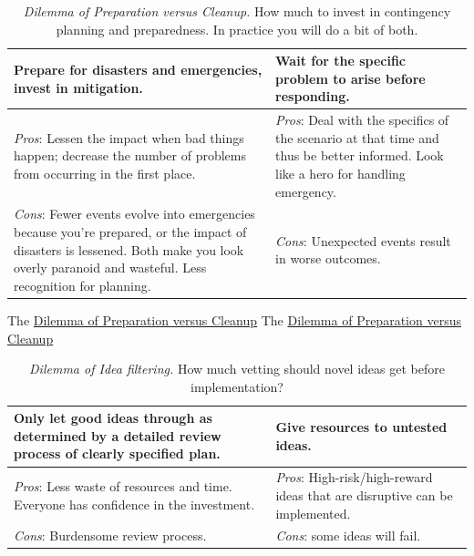 \begin{center}
\begin{table}[H] %
\begin{tabular}{ | m{\dilemmatablewidth}| m{\dilemmatablewidth} | } 
  \hline
  \textbf{Prepare for disasters and emergencies, invest in mitigation.} &
  \textbf{Wait for the specific problem to arise before responding.} \\
  \hline
  \textit{Pros}: Lessen the impact when bad things happen; decrease the number of problems from occurring in the first place. &
  \textit{Pros}: Deal with the specifics of the scenario at that time and thus be better informed. Look like a hero for handling emergency. \\
  \hline
  \textit{Cons}: Fewer events evolve into emergencies because you're prepared, or the impact of disasters is lessened. Both make you look overly paranoid and wasteful. Less recognition for planning. & 
  \textit{Cons}: Unexpected events result in worse outcomes.  \\
  \hline
\end{tabular}
\caption{
\textit{Dilemma of Preparation versus Cleanup.} 
How much to invest in contingency planning and preparedness. In practice you will do a bit of both.}
\label{table:emergencies-vs-ignore}
\end{table}
\end{center}

The \href{table:emergencies-vs-ignore}{Dilemma of Preparation versus Cleanup}
The \href{table:emergencies-vs-ignore}{Dilemma of Preparation versus Cleanup}


\begin{center}
\begin{table}[H] %
\begin{tabular}{ | m{\dilemmatablewidth}| m{\dilemmatablewidth} | } 
  \hline
  \textbf{Only let good ideas through as determined by a detailed review process of clearly specified plan.} &
  \textbf{Give resources to untested ideas.} \\
  \hline
  \textit{Pros}: Less waste of resources and time. Everyone has confidence in the investment. & 
  \textit{Pros}: High-risk/high-reward ideas that are disruptive can be implemented. \\
  \hline
  \textit{Cons}: Burdensome review process. & 
  \textit{Cons}: some ideas will fail. \\
  \hline
\end{tabular}
\caption{
\textit{Dilemma of Idea filtering.}
How much vetting should novel ideas get before implementation?
}
\label{table:idea-filtering}
\end{table}
\end{center}

